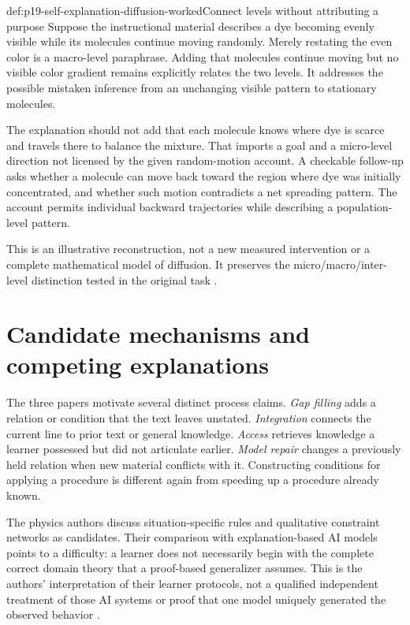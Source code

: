 \begin{hbexample}{def:p19-self-explanation-diffusion-worked}{Connect levels without attributing a purpose}
Suppose the instructional material describes a dye becoming evenly visible
while its molecules continue moving randomly. Merely restating the even
color is a macro-level paraphrase. Adding that molecules continue moving
but no visible color gradient remains explicitly relates the two levels.
It addresses the possible mistaken inference from an unchanging visible
pattern to stationary molecules.

The explanation should not add that each molecule knows where dye is scarce
and travels there to balance the mixture. That imports a goal and a
micro-level direction not licensed by the given random-motion account.
A checkable follow-up asks whether a molecule can move back toward the
region where dye was initially concentrated, and whether such motion
contradicts a net spreading pattern. The account permits individual
backward trajectories while describing a population-level pattern.

This is an illustrative reconstruction, not a new measured intervention
or a complete mathematical model of diffusion. It preserves the
micro/macro/inter-level distinction tested in the original task
\cite[pp.~849--853]{MuldnerBurlesonChi2014Emergent}.
\end{hbexample}

\section{Candidate mechanisms and competing explanations}
\label{sec:p19-self-explanation-mechanisms}

The three papers motivate several distinct process claims. \emph{Gap filling}
adds a relation or condition that the text leaves unstated. \emph{Integration}
connects the current line to prior text or general knowledge. \emph{Access}
retrieves knowledge a learner possessed but did not articulate earlier.
\emph{Model repair} changes a previously held relation when new material
conflicts with it. Constructing conditions for applying a procedure is
different again from speeding up a procedure already known.

The physics authors discuss situation-specific rules and qualitative
constraint networks as candidates. Their comparison with explanation-based
AI models points to a difficulty: a learner does not necessarily begin with
the complete correct domain theory that a proof-based generalizer assumes.
This is the authors' interpretation of their learner protocols, not a
qualified independent treatment of those AI systems or proof that one model
uniquely generated the observed behavior
\cite[pp.~177--180]{ChiEtAl1989SelfExplanations}.


